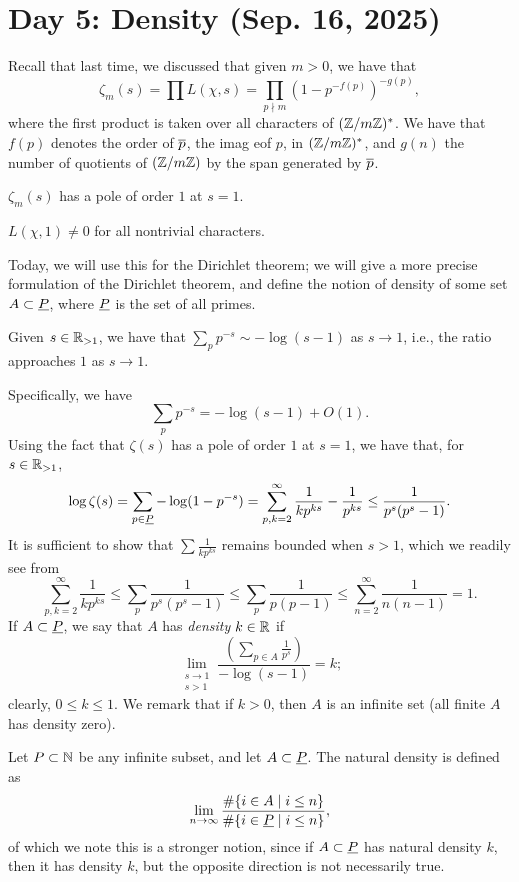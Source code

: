 \section{Day 5: Density (Sep. 16, 2025)}
Recall that last time, we discussed that given $m > 0$, we have that
\[ \zeta_m(s) = \prod L(\chi, s) = \prod_{p \nmid m} \left(1 - p^{-f(p)}\right)^{-g(p)}, \]
where the first product is taken over all characters of $(\mathbb Z/m\mathbb Z)^\ast$. We have that $f(p)$ denotes the order of $\overline p$, the imag eof $p$, in $(\mathbb Z/m\mathbb Z)^
\ast$, and $g(n)$ the number of quotients of $(\mathbb Z/m\mathbb Z)$ by the span generated by $\overline p$.
\begin{theorem}
    $\zeta_m(s)$ has a pole of order $1$ at $s = 1$.
\end{theorem}
\begin{corollary}
    $L(\chi, 1) \neq 0$ for all nontrivial characters.
\end{corollary}
\noindent Today, we will use this for the Dirichlet theorem; we will give a more precise formulation of the Dirichlet theorem, and define the notion of density of some set $A \subset \underline P$, where $\underline P$ is the set of all primes.
\begin{lemma}[4.1]
    Given $s \in \mathbb R_{> 1}$, we have that $\sum_p p^{-s} \sim -\log (s-1)$ as $s \to 1$, i.e., the ratio approaches $1$ as $s \to 1$.
\end{lemma}
\noindent Specifically, we have
\[ \sum_p p^{-s} = -\log(s - 1) + O(1). \]
Using the fact that $\zeta(s)$ has a pole of order $1$ at $s = 1$, we have that, for $s \in \mathbb R_{>1}$,
\[ \log \zeta(s) = \sum_{p \in \underline P} -\log(1 - p^{-s}) = \sum_{p,k = 2}^\infty \frac{1}{kp^{ks}} - \frac{1}{p^{ks}} \leq \frac{1}{p^s(p^s - 1)}. \]
It is sufficient to show that $\sum \frac{1}{kp^{ks}}$ remains bounded when $s > 1$, which we readily see from
\[ \sum_{p,k=2}^\infty \frac{1}{kp^{ks}} \leq \sum_p \frac{1}{p^s(p^s - 1)} \leq \sum_p \frac{1}{p(p - 1)} \leq \sum_{n=2}^\infty \frac{1}{n(n-1)} = 1. \]
If $A \subset \underline P$, we say that $A$ has \textit{density} $k \in \mathbb R$ if
\[ \lim_{\substack{s \to 1 \\ s > 1}} \frac{\left(\sum_{p \in A} \frac{1}{p^s}\right)}{-\log (s-1)} = k; \]
clearly, $0 \leq k \leq 1$. We remark that if $k > 0$, then $A$ is an infinite set (all finite $A$ has density zero).
\begin{remark}
    Let $P \subset \mathbb N$ be any infinite subset, and let $A \subset \underline P$. The natural density is defined as
    \[ \lim_{n \to \infty} \frac{\#\{i \in A \mid i \leq n\}}{\#\{i \in \underline P \mid i \leq n\}}, \]
    of which we note this is a stronger notion, since if $A \subset \underline P$ has natural density $k$, then it has density $k$, but the opposite direction is not necessarily true.
\end{remark}
